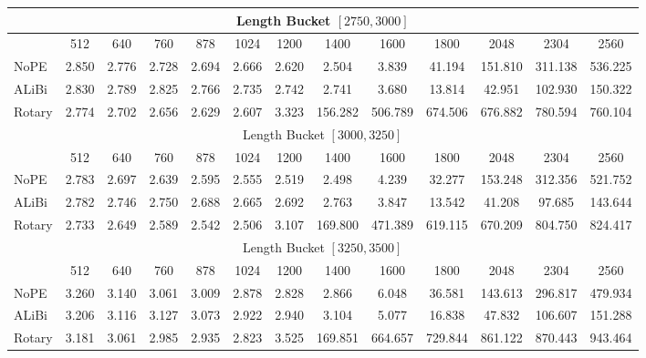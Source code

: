 {\begin{table}[#1]
{\begin{tabular}{l@{\hskip 0.5in}cccccccccccc}
\multicolumn{13}{c}{Length Bucket $[2750, 3000]$} \\
\midrule
 & 512 & 640 & 760 & 878 & 1024 & 1200 & 1400 & 1600 & 1800 & 2048 & 2304 & 2560 \\
 \cmidrule{2-13}
NoPE & 2.850 & 2.776 & 2.728 & 2.694 & 2.666 & 2.620 & 2.504 & 3.839 & 41.194 & 151.810 & 311.138 & 536.225 \\
ALiBi & 2.830 & 2.789 & 2.825 & 2.766 & 2.735 & 2.742 & 2.741 & 3.680 & 13.814 & 42.951 & 102.930 & 150.322 \\
Rotary & 2.774 & 2.702 & 2.656 & 2.629 & 2.607 & 3.323 & 156.282 & 506.789 & 674.506 & 676.882 & 780.594 & 760.104 \\
\midrule

\multicolumn{13}{c}{Length Bucket $[3000, 3250]$} \\
\midrule
 & 512 & 640 & 760 & 878 & 1024 & 1200 & 1400 & 1600 & 1800 & 2048 & 2304 & 2560 \\
 \cmidrule{2-13}
NoPE & 2.783 & 2.697 & 2.639 & 2.595 & 2.555 & 2.519 & 2.498 & 4.239 & 32.277 & 153.248 & 312.356 & 521.752 \\
ALiBi & 2.782 & 2.746 & 2.750 & 2.688 & 2.665 & 2.692 & 2.763 & 3.847 & 13.542 & 41.208 & 97.685 & 143.644 \\
Rotary & 2.733 & 2.649 & 2.589 & 2.542 & 2.506 & 3.107 & 169.800 & 471.389 & 619.115 & 670.209 & 804.750 & 824.417 \\
\midrule

\multicolumn{13}{c}{Length Bucket $[3250, 3500]$} \\
\midrule
 & 512 & 640 & 760 & 878 & 1024 & 1200 & 1400 & 1600 & 1800 & 2048 & 2304 & 2560 \\
 \cmidrule{2-13}
NoPE & 3.260 & 3.140 & 3.061 & 3.009 & 2.878 & 2.828 & 2.866 & 6.048 & 36.581 & 143.613 & 296.817 & 479.934 \\
ALiBi & 3.206 & 3.116 & 3.127 & 3.073 & 2.922 & 2.940 & 3.104 & 5.077 & 16.838 & 47.832 & 106.607 & 151.288 \\
Rotary & 3.181 & 3.061 & 2.985 & 2.935 & 2.823 & 3.525 & 169.851 & 664.657 & 729.844 & 861.122 & 870.443 & 943.464 \\


            \bottomrule
        \end{tabular}
    }
    \label{tab:pretraining:ppl}
\end{table}{}
}


